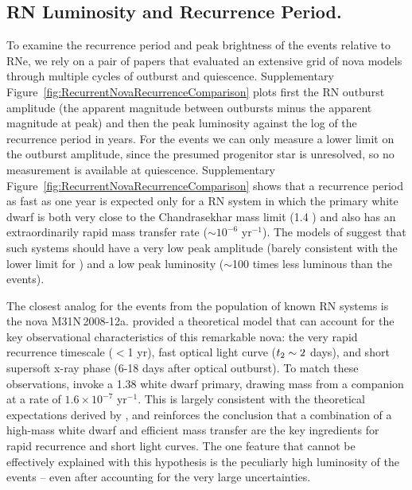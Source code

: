 \subsection{RN Luminosity and Recurrence Period.}\label{sec:RNLuminosityRecurrence}

To examine the recurrence period and peak brightness of the \spock
events relative to RNe, we rely on a pair of papers that evaluated an
extensive grid of nova models through multiple cycles of outburst and
quiescence\citep{Prialnik:1995,Yaron:2005}.  Supplementary
Figure~\ref{fig:RecurrentNovaRecurrenceComparison} plots first the RN
outburst amplitude (the apparent magnitude between outbursts minus the
apparent magnitude at peak) and then the peak luminosity against the
log of the recurrence period in years.
For the \spock events we can only measure a lower limit on the
outburst amplitude, since the presumed progenitor star is unresolved,
so no measurement is available at quiescence. Supplementary
Figure~\ref{fig:RecurrentNovaRecurrenceComparison} shows that a
recurrence period as fast as one year is expected only for a RN system
in which the primary white dwarf is both very close to the
Chandrasekhar mass limit (1.4 \Msun) and also has an extraordinarily
rapid mass transfer rate ($\sim10^{-6}$ \Msun yr$^{-1}$).  The models
of  suggest that such systems should have a very
low peak amplitude (barely consistent with the lower limit for \spock)
and a low peak luminosity ($\sim$100 times less luminous than the
\spock events).

The closest analog for the \spock events from the population of known
RN systems is the nova M31N\,2008-12a.   provided a
theoretical model that can account for the key observational
characteristics of this remarkable nova: the very rapid recurrence
timescale ($<$1 yr), fast optical light curve ($\t2\sim2$ days), and
short supersoft x-ray phase (6-18 days after optical
  outburst)\citep{Henze:2015a}.  To match these observations,
 invoke a 1.38 \Msun white dwarf primary,
drawing mass from a companion at a rate of $1.6\times10^{-7}$ \Msun
yr$^{-1}$.  This is largely consistent with the theoretical
expectations derived by , and reinforces the
conclusion that a combination of a high-mass white dwarf and efficient
mass transfer are the key ingredients for rapid recurrence and short
light curves. The one feature that cannot be effectively explained
with this hypothesis is the peculiarly high luminosity of the \spock
events -- even after accounting for the very large uncertainties. 
